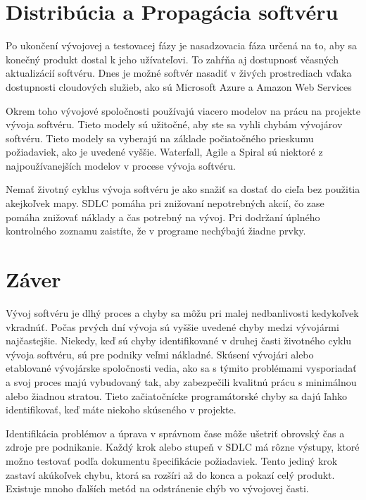 \documentclass[10pt,twoside,slovak,a4paper]{article}
\begin{document}
\section{Distribúcia a Propagácia softvéru}
Po ukončení vývojovej a testovacej fázy je nasadzovacia fáza určená na to, aby sa konečný produkt dostal k jeho užívateľovi. To zahŕňa aj dostupnosť včasných aktualizácií softvéru. Dnes je možné softvér nasadiť v živých prostrediach vďaka dostupnosti cloudových služieb, ako sú Microsoft Azure a Amazon Web Services

Okrem toho vývojové spoločnosti používajú viacero modelov na prácu na projekte vývoja softvéru. Tieto modely sú užitočné, aby ste sa vyhli chybám vývojárov softvéru. Tieto modely sa vyberajú na základe počiatočného prieskumu požiadaviek, ako je uvedené vyššie. Waterfall, Agile a Spiral sú niektoré z najpoužívanejších modelov v procese vývoja softvéru.

Nemať životný cyklus vývoja softvéru je ako snažiť sa dostať do cieľa bez použitia akejkoľvek mapy. SDLC pomáha pri znižovaní nepotrebných akcií, čo zase pomáha znižovať náklady a čas potrebný na vývoj. Pri dodržaní úplného kontrolného zoznamu zaistíte, že v programe nechýbajú žiadne prvky.
















\section{Záver}
Vývoj softvéru je dlhý proces a chyby sa môžu pri malej nedbanlivosti kedykoľvek vkradnúť. Počas prvých dní vývoja sú vyššie uvedené chyby medzi vývojármi najčastejšie. Niekedy, keď sú chyby identifikované v druhej časti životného cyklu vývoja softvéru, sú pre podniky veľmi nákladné. Skúsení vývojári alebo etablované vývojárske spoločnosti vedia, ako sa s týmito problémami vysporiadať a svoj proces majú vybudovaný tak, aby zabezpečili kvalitnú prácu s minimálnou alebo žiadnou stratou. Tieto začiatočnícke programátorské chyby sa dajú ľahko identifikovať, keď máte niekoho skúseného v projekte.

Identifikácia problémov a úprava v správnom čase môže ušetriť obrovský čas a zdroje pre podnikanie. Každý krok alebo stupeň v SDLC má rôzne výstupy, ktoré možno testovať podľa dokumentu špecifikácie požiadaviek. Tento jediný krok zastaví akúkoľvek chybu, ktorá sa rozšíri až do konca a pokazí celý produkt. Existuje mnoho ďalších metód na odstránenie chýb vo vývojovej časti.
\end{document}
